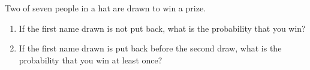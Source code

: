 Two of seven people in a hat are drawn to win a prize.
\begin{enumerate}
\item[(a)] If the first name drawn is not put back, what is the probability that you win?
\item[(b)] If the first name drawn is put back before the second draw, what is the probability that you win at least once?
\end{enumerate}
